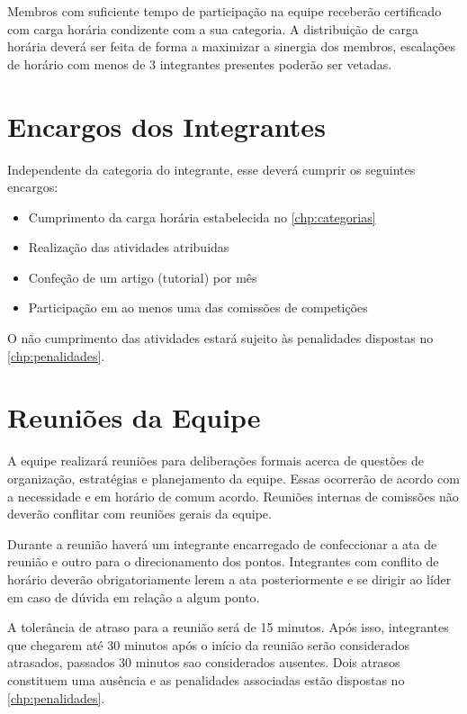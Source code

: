 Membros com suficiente tempo de participação na equipe receberão certificado com carga horária condizente com a sua categoria. A distribuição de carga horária deverá ser feita de forma a maximizar a sinergia dos membros, escalações de horário com menos de 3 integrantes presentes poderão ser vetadas.


\chapter{Encargos dos Integrantes}
\label{chp:encargos}

Independente da categoria do integrante, esse deverá cumprir os seguintes encargos:

\begin{itemize}
\item Cumprimento da carga horária estabelecida no \autoref{chp:categorias}
\item Realização das atividades atribuidas
\item Confeção de um artigo (tutorial) por mês
\item Participação em ao menos uma das comissões de competições
\end{itemize}

O não cumprimento das atividades estará sujeito às penalidades dispostas no \autoref{chp:penalidades}.

\chapter{Reuniões da Equipe}
\label{chp:reunioes}

A equipe realizará reuniões para deliberações formais acerca de questões de organização, estratégias e planejamento da equipe. Essas ocorrerão de acordo com a necessidade e em horário de comum acordo. Reuniões internas de comissões não deverão conflitar com reuniões gerais da equipe.

Durante a reunião haverá um integrante encarregado de confeccionar a ata de reunião e outro para o direcionamento dos pontos. Integrantes com conflito de horário deverão obrigatoriamente lerem a ata posteriormente e se dirigir ao líder em caso de dúvida em relação a algum ponto.

A tolerância de atraso para a reunião será de 15 minutos. Após isso, integrantes que chegarem até 30 minutos após o início da reunião serão considerados atrasados, passados 30 minutos sao considerados ausentes. Dois atrasos constituem uma ausência e as penalidades associadas estão dispostas no \autoref{chp:penalidades}.

